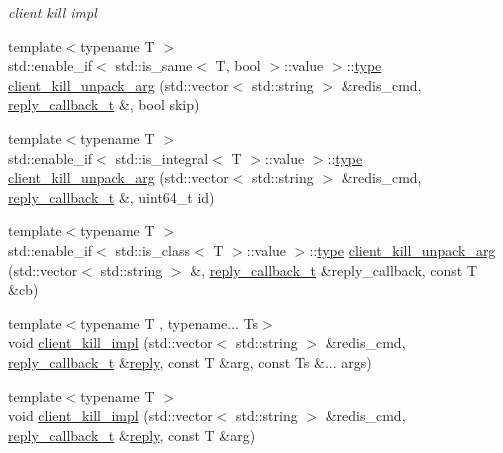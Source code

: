 \begin{DoxyCompactItemize}
\begin{DoxyCompactList}\small\item\em client kill impl \end{DoxyCompactList}\item 
{\footnotesize template$<$typename T $>$ }\\std\+::enable\+\_\+if$<$ std\+::is\+\_\+same$<$ T, bool $>$\+::value $>$\+::\hyperlink{classcpp__redis_1_1client_ac284ea9a5c0e95d49a675403aaf4847c}{type} \hyperlink{classcpp__redis_1_1client_a9b6a6f361db2ca27d4714447088729fe}{client\+\_\+kill\+\_\+unpack\+\_\+arg} (std\+::vector$<$ std\+::string $>$ \&redis\+\_\+cmd, \hyperlink{classcpp__redis_1_1client_a061a1140d36d2eaeda82b09a0bb3f9f2}{reply\+\_\+callback\+\_\+t} \&, bool skip)
\item 
{\footnotesize template$<$typename T $>$ }\\std\+::enable\+\_\+if$<$ std\+::is\+\_\+integral$<$ T $>$\+::value $>$\+::\hyperlink{classcpp__redis_1_1client_ac284ea9a5c0e95d49a675403aaf4847c}{type} \hyperlink{classcpp__redis_1_1client_a903f6271de841721661359c4be055adb}{client\+\_\+kill\+\_\+unpack\+\_\+arg} (std\+::vector$<$ std\+::string $>$ \&redis\+\_\+cmd, \hyperlink{classcpp__redis_1_1client_a061a1140d36d2eaeda82b09a0bb3f9f2}{reply\+\_\+callback\+\_\+t} \&, uint64\+\_\+t id)
\item 
{\footnotesize template$<$typename T $>$ }\\std\+::enable\+\_\+if$<$ std\+::is\+\_\+class$<$ T $>$\+::value $>$\+::\hyperlink{classcpp__redis_1_1client_ac284ea9a5c0e95d49a675403aaf4847c}{type} \hyperlink{classcpp__redis_1_1client_ab07713bcc08277292f6dc64ae89c1134}{client\+\_\+kill\+\_\+unpack\+\_\+arg} (std\+::vector$<$ std\+::string $>$ \&, \hyperlink{classcpp__redis_1_1client_a061a1140d36d2eaeda82b09a0bb3f9f2}{reply\+\_\+callback\+\_\+t} \&reply\+\_\+callback, const T \&cb)
\item 
{\footnotesize template$<$typename T , typename... Ts$>$ }\\void \hyperlink{classcpp__redis_1_1client_a1f895140bce1499fabc1fb2fb4d6600d}{client\+\_\+kill\+\_\+impl} (std\+::vector$<$ std\+::string $>$ \&redis\+\_\+cmd, \hyperlink{classcpp__redis_1_1client_a061a1140d36d2eaeda82b09a0bb3f9f2}{reply\+\_\+callback\+\_\+t} \&\hyperlink{classcpp__redis_1_1reply}{reply}, const T \&arg, const Ts \&... args)
\item 
{\footnotesize template$<$typename T $>$ }\\void \hyperlink{classcpp__redis_1_1client_a1d40b08734a2ed59a5b09739c5f32fae}{client\+\_\+kill\+\_\+impl} (std\+::vector$<$ std\+::string $>$ \&redis\+\_\+cmd, \hyperlink{classcpp__redis_1_1client_a061a1140d36d2eaeda82b09a0bb3f9f2}{reply\+\_\+callback\+\_\+t} \&\hyperlink{classcpp__redis_1_1reply}{reply}, const T \&arg)

\end{DoxyCompactItemize}
